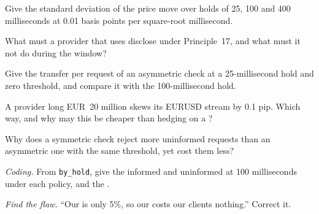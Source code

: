 \begin{exercise}[$\star$]\label{exo:m2:fx-spot-microstructure:2}
Give the standard deviation of the price move over holds of 25, 100 and 400
milliseconds at 0.01 basis points per square-root millisecond.
\end{exercise}

\begin{exercise}[$\star$]\label{exo:m2:fx-spot-microstructure:3}
What must a provider that uses  disclose under Principle~17, and what
must it not do during the window?
\end{exercise}

\begin{exercise}[$\star\star$]\label{exo:m2:fx-spot-microstructure:4}
Give the transfer per request of an asymmetric check at a 25-millisecond hold
and zero threshold, and compare it with the 100-millisecond hold.
\end{exercise}

\begin{exercise}[$\star\star$]\label{exo:m2:fx-spot-microstructure:5}
A provider long EUR~20 million skews its EURUSD stream by 0.1 pip. Which way,
and why may this be cheaper than hedging on a ?
\end{exercise}

\begin{exercise}[$\star\star$]\label{exo:m2:fx-spot-microstructure:6}
Why does a symmetric check reject more uninformed requests than an asymmetric
one with the same threshold, yet cost them less?
\end{exercise}

\begin{exercise}[$\star\star\star$]\label{exo:m2:fx-spot-microstructure:7}
\emph{Coding.} From \texttt{by\_hold}, give the informed and uninformed  at 100 milliseconds under each policy, and the .
\end{exercise}

\begin{exercise}[$\star\star\star$]\label{exo:m2:fx-spot-microstructure:8}
\emph{Find the flaw.} ``Our  is only 5\%, so our  costs
our clients nothing.'' Correct it.
\end{exercise}

